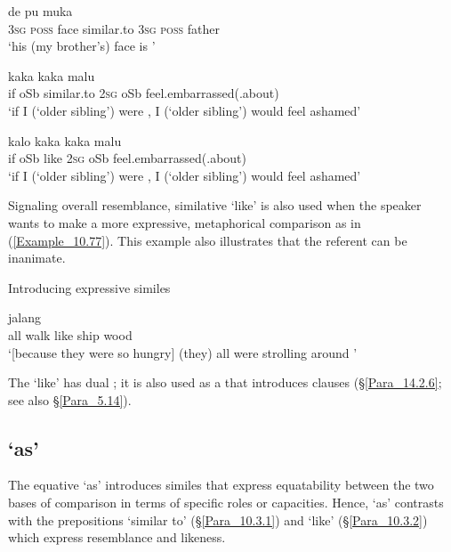 \ex
\label{Example_10.75b}
\gll  de  pu  muka        \\
   \textsc{3sg}  \textsc{poss}  face  similar.to  \textsc{3sg}  \textsc{poss}  father\\
\glt ‘his (my brother’s) face is ’ \textstyleExampleSource{[Elicited BR120817.007]}
\z
\z

\ea
\label{Example_10.76}
\ea
\label{Example_10.76a}
 {kaka} {} {} {kaka} {malu}\\ %
   if  oSb  similar.to  \textsc{2sg}  oSb  feel.embarrassed(.about)\\
\glt ‘if I (‘older sibling’) were , I (‘older sibling’) would feel ashamed’ \textstyleExampleSource{[081115-001a-Cv.0040]}
\vspace{5pt}

\ex
\label{Example_10.76b}
\gll  kalo  kaka      kaka  malu\\
   if  oSb  like  \textsc{2sg}  oSb  feel.embarrassed(.about)\\
\glt ‘if I (‘older sibling’) were , I (‘older sibling’) would feel ashamed’ \textstyleExampleSource{[Elicited BR120817.006]}
\z
\z


Signaling overall resemblance, similative  ‘like’ is also used when the speaker wants to make a more expressive, metaphorical comparison as in (\ref{Example_10.77}). This example also illustrates that the referent can be inanimate.


\begin{styleExampleTitle}
Introducing expressive similes
\end{styleExampleTitle}

\ea
\label{Example_10.77}
 {jalang} {} {} {}\\ %
 all  walk  like  ship  wood\\
\glt 
‘[because they were so hungry] (they) all were strolling around ’ \textstyleExampleSource{[081025-009a-Cv.0188]}
\z


The   ‘like’ has dual ; it is also used as a  that introduces  clauses (§\ref{Para_14.2.6}; see also §\ref{Para_5.14}).


\subsection{ ‘as’}
\label{Para_10.3.3}
The equative   ‘as’ introduces similes that express equatability between the two bases of comparison in terms of specific roles or capacities. Hence,  ‘as’ contrasts with the  prepositions  ‘similar to’ (§\ref{Para_10.3.1}) and  ‘like’ (§\ref{Para_10.3.2}) which express resemblance and likeness.



